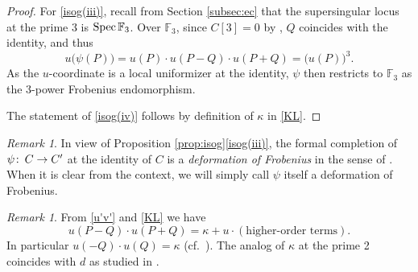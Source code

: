 \documentclass{gtpart}
\theoremstyle{definition}
\theoremstyle{remark}
\newtheorem{rmk}[thm]{Remark}
\def\co{\colon\thinspace}
\newcommand{\mb}[1]{\mathbb{#1}}
\newcommand{\Spec}{{\rm Spec\thinspace}}
\newcommand{\BF}{{\mb F}}
\newcommand{\K}{\kappa}
\newcommand{\isog}[1]{Proposition \ref{prop:isog}\thinspace \eqref{isog(#1)}}
\begin{document}
\begin{proof}
 For \eqref{isog(iii)}, recall from Section \ref{subsec:ec} that the 
 supersingular locus at the prime 3 is $\Spec \BF_3$.  Over $\BF_3$, 
 since $C[3] = 0$ by \cite[V.3.1a]{AEC}, $Q$ coincides with the identity, 
 and thus 
 \[
  u\big( \psi(P) \big) = u(P) \cdot u(P-Q) \cdot u(P+Q) = \big( u(P) \big)^3.  
 \]
 As the $u$-coordinate is a local uniformizer at the identity, $\psi$ 
 then restricts to $\BF_3$ as the 3-power Frobenius endomorphism.  

 The statement of \eqref{isog(iv)} follows by definition of $\K$ in 
 \eqref{KL}.  
\end{proof}

\begin{rmk}
 In view of \isog{iii}, the formal completion of $\psi \co C \to C'$ at 
 the identity of $C$ is a {\em deformation of Frobenius} in the sense of 
 \cite[11.3]{cong}.  When it is clear from the context, we will simply 
 call $\psi$ itself a deformation of Frobenius.  
\end{rmk}

\begin{rmk}
\label{rmk:K}
 From \eqref{u'v'} and \eqref{KL} we have 
 \begin{equation}
 \label{norm}
  u(P-Q) \cdot u(P+Q) = \K + u \cdot (\text{higher-order terms}).  
 \end{equation}
 In particular $u(-Q) \cdot u(Q) = \K$ 
 (cf.~\cite[Proposition 7.5.2 and Section 7.7]{KM}).  The analog of $\K$ 
 at the prime 2 coincides with $d$ as studied in \cite[Section 3]{h2p2}.  
\end{rmk}
\end{document}
